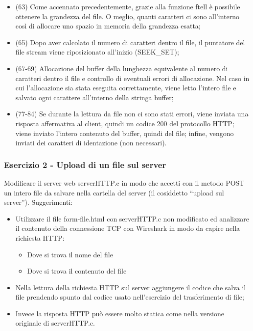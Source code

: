 \documentclass[a4paper]{article}
\newcommand{\dquotes}[1]{``#1''}
\begin{document}
\begin{itemize}
\begin{itemize}
			\item (63) Come accennato precedentemente, grazie alla funzione \textsf{ftell} è possibile ottenere la grandezza del file. O meglio, quanti caratteri ci sono all'interno così di allocare uno spazio in memoria della grandezza esatta;
			
			\item (65) Dopo aver calcolato il numero di caratteri dentro il file, il puntatore del file stream viene riposizionato all'inizio (\textsf{SEEK\_SET});
			
			\item (67-69) Allocazione del buffer della lunghezza equivalente al numero di caratteri dentro il file e controllo di eventuali errori di allocazione. Nel caso in cui l'allocazione sia stata eseguita correttamente, viene letto l'intero file e salvato ogni carattere all'interno della stringa \textsf{buffer};
			
			\item (77-84) Se durante la lettura da file non ci sono stati errori, viene inviata una risposta affermativa al client, quindi un codice 200 del protocollo HTTP; viene inviato l'intero contenuto del buffer, quindi del file; infine, vengono inviati dei caratteri di identazione (non necessari).
		\end{itemize}
	\end{itemize}\newpage
	
	\subsubsection{Esercizio 2 - Upload di un file sul server}
	
	Modificare il server web \textsf{serverHTTP.c} in modo che accetti con il metodo POST un intero file da salvare nella cartella del server (il cosiddetto \dquotes{upload sul server}). Suggerimenti:
	\begin{itemize}
		\item Utilizzare il file \textsf{form-file.html} con \textsf{serverHTTP.c} non modificato ed analizzare il contenuto della connessione TCP con Wireshark in modo da capire nella richiesta HTTP:
		\begin{itemize}
			\item Dove si trova il nome del file
			\item Dove si trova il contenuto del file
		\end{itemize}
		
		\item Nella lettura della richiesta HTTP sul server aggiungere il codice che salva il file prendendo spunto dal codice usato nell'esercizio del trasferimento di file;
		
		\item Invece la risposta HTTP può essere molto statica come nella versione originale di \textsf{serverHTTP.c}.
	\end{itemize}
	
\end{document}

